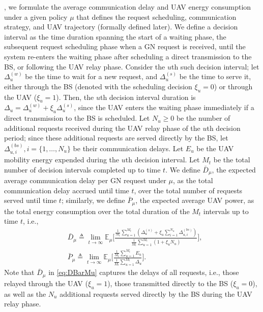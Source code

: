 \documentclass[10pt, twocolumn]{IEEEtran}
\theoremstyle{plain}
\theoremstyle{definition}
\theoremstyle{remark}
\begin{document}
, we formulate the average communication delay and UAV energy consumption under a given policy $\mu$ that defines the request scheduling, communication strategy, and UAV trajectory (formally defined later). We define a decision interval as the time duration spanning the start of a {waiting} phase, the subsequent {request scheduling} phase when a GN request is received, until the system re-enters the {waiting} phase after scheduling a direct transmission to the BS, or following the {UAV relay} phase. Consider the $u$th such decision interval; let $\Delta_{u}^{(w)}$ be the time to wait for a new request, and $\Delta_{u}^{(s)}$ be the time to serve it, either through the BS (denoted with the scheduling decision $\xi_{u}{=}0$) or through the UAV ($\xi_{u}{=}1$). Then, the $u$th decision interval duration is $\Delta_{u}{=}\Delta_{u}^{(w)}{+}\xi_{u}\Delta_{u}^{(s)}$, since the UAV enters the {waiting phase} immediately if a direct transmission to the BS is scheduled. Let $N_{u}{\geq}0$ be the number of additional requests received during the UAV relay phase of the $u$th decision period; since these additional requests are served directly by the BS, let $\Delta_{u,i}^{(bs)},i=\{1,{\dots},N_{u}\}$ be their communication delays. Let $E_{u}$ be the UAV mobility energy expended during the $u$th decision interval. Let $M_{t}$ be the total number of decision intervals completed up to time $t$. We define $\bar{D}_{\mu}$, the expected average communication delay per GN request under $\mu$, as the total communication delay accrued until time $t$, over the total number of requests served until time $t$; similarly, we define $\bar{P}_{\mu}$, the expected average UAV power, as the total energy consumption over the total duration of the $M_{t}$ intervals up to time $t$, i.e.,
\begin{align}\label{eq:DBarMu}
    &\bar{D}_{\mu} \triangleq \lim_{t \rightarrow \infty} \mathbb{E}_{\mu} \Bigg[
    \frac{\frac{1}{M_t}\sum_{u = 1}^{M_t}(\Delta_u^{(s)}+\xi_u\sum_{i=1}^{N_u}\Delta_{u,i}^{(bs)})}{
    \frac{1}{M_t}\sum_{u = 1}^{M_t}(1+\xi_uN_u)
    }\Bigg],\\ 	&\bar{P}_{\mu} \triangleq \lim_{t \rightarrow \infty} \mathbb{E}_{\mu} \Bigg[ \frac{\frac{1}{M_t}\sum_{u = 1}^{M_t}E_u}{\frac{1}{M_t}\sum_{u = 1}^{M_t} \Delta_u}\Bigg].
\end{align}
Note that $\bar{D}_{\mu}$ in \eqref{eq:DBarMu} captures the delays of all requests, i.e., those relayed through the UAV ($\xi_{u}{=}1$), those transmitted directly to the BS ($\xi_{u}{=}0$), as well as the $N_{u}$ additional requests served directly by the BS during the UAV relay phase.
\end{document}

